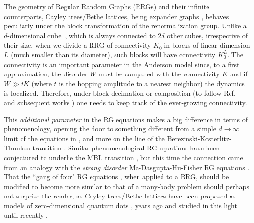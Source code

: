 \documentclass[reprint,aps,prl,superscriptaddress,english,nolongbibliography]{revtex4-2}
\begin{document}
The geometry of Regular Random Graphs (RRGs) and their infinite counterparts, Cayley trees/Bethe lattices, being expander graphs \cite{kowalski2019introduction}, behaves peculiarly under the block transformation of the renormalization group. Unlike a $d$-dimensional cube~\cite{Tarquini2017critical}, which is always connected to $2d$ other cubes, irrespective of their size, when we divide a RRG of connectivity $K_0$ in blocks of linear dimension $L$ (much smaller than its diameter), such blocks will have connectivity $K_0^L$. The connectivity is an important parameter in the Anderson model since, to a first approximation, the disorder $W$ must be compared with the connectivity $K$ and if $W\gg t K$ (where $t$ is the hopping amplitude to a nearest neighbor) the dynamics is localized. Therefore, under block decimation or composition (to follow Ref.~\cite{abrahams1979scaling} and subsequent works \cite{lee1979real}) one needs to keep track of the ever-growing connectivity.

This {\it additional parameter} in the RG equations makes a big difference in terms of phenomenology, opening the door to something different from a simple $d\to\infty$ limit of the equations in \cite{abrahams1979scaling}, and more on the line of the Berezinski-Kosterlitz-Thouless transition \cite{1971JETP...32..493B,1972JETP...34..610B,1973JPhC....6.1181K}. Similar phenomenological RG equations have been conjectured to underlie the MBL transition \cite{PhysRevX.5.031032,PhysRevX.5.031033,PhysRevB.93.224201,Dumitrescu2019KT}, but this time the connection came from an analogy with the {\it strong disorder} Ma-Dasgupta-Hu-Fisher RG equations \cite{ma1979random,dasgupta1980low,fisher1994random,huse2023strongrandomness}. That the ``gang of four" RG equations \cite{abrahams1979scaling}, when applied to a RRG, should be modified to become more similar to that of a many-body problem should perhaps not surprise the reader, as Cayley trees/Bethe lattices have been proposed as models of zero-dimensional quantum dots \cite{sivan1994quasi}, years ago \cite{altshuler1997quasiparticle} and studied in this light until recently \cite{de2014anderson,tikhonov2021AndersonMBL}.
\end{document}
